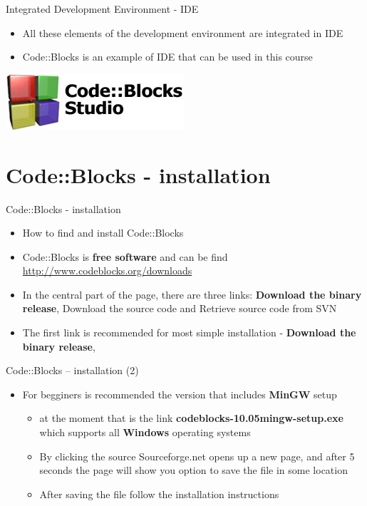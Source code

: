 \begin{frame}{Integrated Development Environment - IDE}
\begin{itemize}
  \item All these elements of the development environment are integrated in IDE
  \item Code::Blocks is an example of IDE that can be used in this course
\end{itemize}
\begin{center}
\includegraphics[scale=0.5]{images/cb_logo}
\end{center}
\end{frame}

\section{Code::Blocks - installation}
\begin{frame}{Code::Blocks - installation}
\begin{itemize}
  \item How to find and install Code::Blocks
  \item Code::Blocks is \textbf{free software} and can be find \linebreak
  \href{http://www.codeblocks.org/downloads}{http://www.codeblocks.org/downloads}
  \item In the central part of the page, there are three links:
  \textbf{Download the binary release}, Download the source code and Retrieve
  source code from SVN
  \item The first link is recommended for most simple installation
  - \textbf{Download the binary release},
\end{itemize}
\end{frame}

\begin{frame}{Code::Blocks – installation (2)}
\begin{itemize}
  \item For begginers is recommended the version that includes \textbf{MinGW} setup
    \begin{itemize}
  \item at the moment that is the link \textbf{codeblocks-10.05mingw-setup.exe}
  which supports all \textbf{Windows} operating systems
  \item By clicking the source Sourceforge.net opens up a new page, and after 5
  seconds the page will show you option to save the file in some location
  \item After saving the file follow the installation instructions
    \end{itemize}
\end{itemize}
\end{frame}

